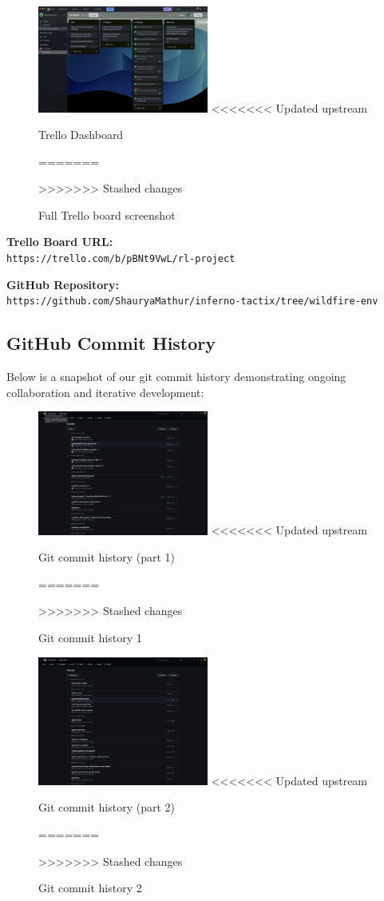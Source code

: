 \documentclass[conference]{IEEEtran}
\begin{document}
\begin{figure}[H]
    \centering
    \includegraphics[width=0.5\textwidth]{trello_rl.png}
<<<<<<< Updated upstream
    \caption{Trello Dashboard}
=======
    \caption{Full Trello board screenshot}
>>>>>>> Stashed changes
    \end{figure}

\vspace{-0.3cm}
\noindent\textbf{Trello Board URL:} \\
\texttt{https://trello.com/b/pBNt9VwL/rl-project}

\vspace{0.3cm}
\noindent\textbf{GitHub Repository:} \\
\texttt{https://github.com/ShauryaMathur/inferno-tactix/tree/wildfire-env}

\subsection{GitHub Commit History}
\hspace{-0.4cm}Below is a snapshot of our git commit history demonstrating ongoing collaboration and iterative development:

\begin{figure}[H]
\centering
\includegraphics[width=0.5\textwidth]{git1.png}
<<<<<<< Updated upstream
\caption{Git commit history (part 1)}
=======
\caption{Git commit history 1}
>>>>>>> Stashed changes
\end{figure}

\begin{figure}[H]
    \centering
    \includegraphics[width=0.5\textwidth]{git2.png}
<<<<<<< Updated upstream
    \caption{Git commit history (part 2)}
=======
    \caption{Git commit history 2}
>>>>>>> Stashed changes
    \end{figure}
\end{document}
